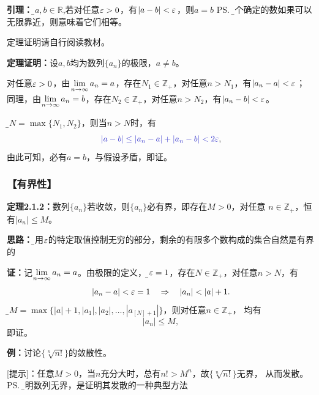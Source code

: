 {\bf 引理：}{\b 设$a,b\in\mathbb{R}$,若对任意$\varepsilon>0$，有$|a-b|<\varepsilon$，则$a=b$}
\ps{\b 两个确定的数如果可以无限靠近，则意味着它们相等。}

定理证明请自行阅读教材。

{\bf 定理证明：}设$a,b$均为数列$\{a_n\}$的极限，$a\ne b$。

对任意$\varepsilon>0$，由$\lim\limits_{n\to\infty} a_n=a$，存在$N_1\in\mathbb{Z}_+$，对任意$n>N_1$，有$|a_n-a|<\varepsilon$；
同理，由$\lim\limits_{n\to\infty} a_n=b$，存在$N_2\in\mathbb{Z}_+$，对任意$n>N_2$，有$|a_n-b|<\varepsilon$。

令{\b $N=\max\{N_1,N_2\}$}，则当$n>N$时，有
$${\b |a-b|\leq|a_n-a|+|a_n-b|<2\e},$$
由此可知，必有$a=b$，与假设矛盾，即证。

\subsubsection{【有界性】}

{\bf 定理2.1.2：}数列$\{a_n\}$若收敛，则$\{a_n\}$必有界，即存在$M>0$，对任意
$n\in\mathbb{Z}_+$，恒有$|a_n|\leq M$。

\begin{center}
\end{center}

{\bf 思路：}{\b 利用$\varepsilon$的特定取值控制无穷的部分，剩余的有限多个数构成的集合自然是有界的}

{\bf 证：}记$\lim\limits_{n\to\infty} a_n=a$。由极限的定义，对{\b$\varepsilon=1$}，存在$N\in\mathbb{Z}_+$，对任意$n>N$，有
$$|a_n-a|<\e=1\quad\Rightarrow\quad |a_n|<|a|+1.$$
记{\b$M=\max\{|a|+1,|a_1|,|a_2|,\ldots,|a_{[N]+1}|\}$}，则对任意$n\in\mathbb{Z}_+$，
均有
$$|a_n|\leq M,$$
即证。

{\bf 例：}讨论$\{\sqrt[n]{n!}\}$的敛散性。

[提示]：任意$M>0$，当$n$充分大时，总有$n!>M^n$，故$\{\sqrt[n]{n!}\}$无界，
从而发散。\ps{\b 证明数列无界，是证明其发散的一种典型方法}

